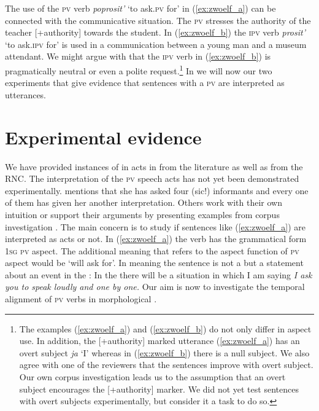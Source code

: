 \documentclass[output=paper,colorlinks,citecolor=brown,newtxmath,hidelinks]{langscibook}
\begin{document}
\noindent The use of the \textsc{pv} verb \textit{poprosit’} ‘to ask\textsc{.pv} for’ in (\ref{ex:zwoelf_a}) can be connected with the communicative situation. The \textsc{pv}  stresses the authority of the teacher [+authority] towards the student. In (\ref{ex:zwoelf_b}) the \textsc{ipv} verb \textit{prosit’} ‘to ask\textsc{.ipv} for’ is used in a communication between a young man and a museum attendant. We might argue with \citeauthor{Israeli2001} that the \textsc{ipv} verb in (\ref{ex:zwoelf_b}) is pragmatically neutral or even a polite request.\footnote{The examples (\ref{ex:zwoelf_a}) and (\ref{ex:zwoelf_b}) do not only differ in aspect use. In addition, the [+authority] marked utterance (\ref{ex:zwoelf_a}) has an overt subject \textit{ja} ‘I’ whereas in (\ref{ex:zwoelf_b}) there is a null subject. We also agree with one of the reviewers that the sentences improve with overt subject. Our own corpus investigation leads us to the assumption that an overt subject encourages the [+authority] marker. We did not yet test sentences with overt subjects experimentally, but consider it a  task to do so.\label{fn5}} In  we will now  our two experiments that give evidence that sentences with a \textsc{pv}  are interpreted as  utterances. 

\section{Experimental evidence}\label{sct:zwei}

We have provided instances of   in  acts in  from the literature as well as from the RNC. The interpretation of the \textsc{pv} speech acts has not yet been demonstrated experimentally. \citet{Rathmayr1976} mentions that she has asked four (sic!) informants and every one of them has given her another interpretation. Others work with their own intuition or support their arguments by presenting examples from corpus investigation \citep{Wiemer2014,Laczinski2014}. The main concern is to study if sentences like (\ref{ex:zwoelf_a}) are interpreted as  acts or not. In (\ref{ex:zwoelf_a}) the verb has the grammatical form \textsc{1sg pv} aspect. The additional meaning that refers to the aspect function of \textsc{pv} aspect would be ‘will ask for’. In  meaning the sentence is not a  but a statement about an event in the : In the  there will be a situation in which I am saying \textit{I ask you to speak loudly and one by one.} Our aim is now to investigate the temporal alignment of \textsc{pv}  verbs in morphological .
\end{document}
